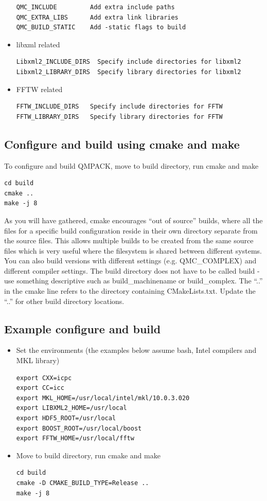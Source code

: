\begin{itemize}
\begin{verbatim}
QMC_INCLUDE         Add extra include paths
QMC_EXTRA_LIBS      Add extra link libraries
QMC_BUILD_STATIC    Add -static flags to build
\end{verbatim}
\item libxml related
\begin{verbatim}
Libxml2_INCLUDE_DIRS  Specify include directories for libxml2
Libxml2_LIBRARY_DIRS  Specify library directories for libxml2
\end{verbatim}
 \item FFTW related
\begin{verbatim}
FFTW_INCLUDE_DIRS   Specify include directories for FFTW
FFTW_LIBRARY_DIRS   Specify library directories for FFTW
\end{verbatim}
\end{itemize}

\subsection{Configure and build using cmake and make}
To configure and build QMPACK, move to build directory, run cmake and make
\begin{verbatim}
cd build
cmake ..
make -j 8
\end{verbatim}

As you will have gathered, cmake encourages ``out of source'' builds,
where all the files for a specific build configuration reside in their
own directory separate from the source files. This allows multiple
builds to be created from the same source files which is very useful
where the filesystem is shared between different systems. You can also
build versions with different settings (e.g. QMC\_COMPLEX) and
different compiler settings. The build directory does not have to be
called build - use something descriptive such as build\_machinename or
build\_complex. The ``..'' in the cmake line refers to the directory
containing CMakeLists.txt. Update the ``..'' for other build 
directory locations.

\subsection{Example configure and build}
\begin{itemize}
\item Set the environments (the examples below assume bash, Intel compilers and MKL library)
\begin{verbatim}
export CXX=icpc
export CC=icc
export MKL_HOME=/usr/local/intel/mkl/10.0.3.020
export LIBXML2_HOME=/usr/local
export HDF5_ROOT=/usr/local
export BOOST_ROOT=/usr/local/boost
export FFTW_HOME=/usr/local/fftw
\end{verbatim}

\item Move to build directory, run cmake and make
\begin{verbatim}
cd build
cmake -D CMAKE_BUILD_TYPE=Release ..
make -j 8
\end{verbatim}
\end{itemize}

